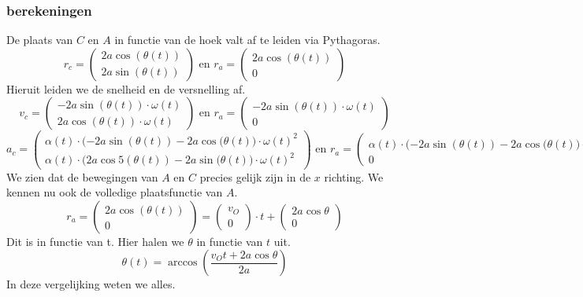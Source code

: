 \documentclass[10pt,a4paper]{article}
\begin{document}
\subsubsection*{berekeningen}
De plaats van $C$ en $A$ in functie van de hoek valt af te leiden via Pythagoras.
\[
r_{c} =
\begin{pmatrix}
2a\cos{(\theta(t))}\\
2a\sin{(\theta(t))}
\end{pmatrix}
\text{ en }
r_{a} =
\begin{pmatrix}
2a\cos{(\theta(t))}\\
0
\end{pmatrix}
\]
Hieruit leiden we de snelheid en de versnelling af.
\[
v_{c} =
\begin{pmatrix}
-2a\sin{(\theta(t))}\cdot\omega(t)\\
2a\cos{(\theta(t))}\cdot\omega(t)
\end{pmatrix}
\text{ en }
r_{a} =
\begin{pmatrix}
-2a\sin{(\theta(t))}\cdot\omega(t)\\
0
\end{pmatrix}
\]
\[
a_{c} =
\begin{pmatrix}
\alpha(t)\cdot (-2a\sin({\theta(t)})-2a\cos({\theta(t))}\cdot\omega(t)^{2}\\
\alpha(t)\cdot (2a\cos5({\theta(t)})-2a\sin({\theta(t))}\cdot\omega(t)^{2}
\end{pmatrix}
\text{ en }
r_{a} =
\begin{pmatrix}
\alpha(t)\cdot (-2a\sin({\theta(t)})-2a\cos({\theta(t))}\cdot\omega(t)^{2}\\
0
\end{pmatrix}
\]
We zien dat de bewegingen van $A$ en $C$ precies gelijk zijn in de $x$ richting.
We kennen nu ook de volledige plaatsfunctie van $A$.
\[
r_{a} = 
\begin{pmatrix}
2a\cos{(\theta(t))}\\
0
\end{pmatrix}
=
\begin{pmatrix}
v_{O}\\
0
\end{pmatrix}
\cdot t
+
\begin{pmatrix}
2a\cos{\theta}\\
0
\end{pmatrix}
\]
Dit is in functie van t. Hier halen we $\theta$ in functie van $t$ uit.
\[
\theta(t) = \arccos{\left(\frac{v_{O}t + 2a\cos{\theta}}{2a}\right)}
\]
In deze vergelijking weten we alles.
\end{document}
